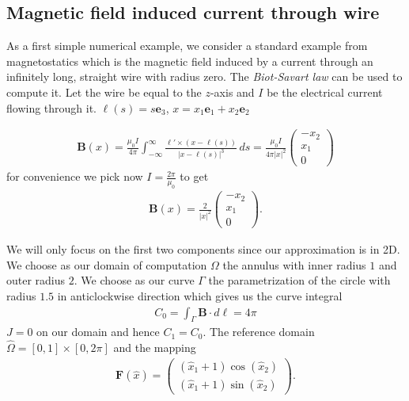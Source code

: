 \documentclass[../master_thesis.tex]{subfiles}
\begin{document}
\subsection{Magnetic field induced current through wire}
As a first simple numerical example, we consider a standard example from 
magnetostatics which is the magnetic field induced by a current through an infinitely long, 
straight wire with radius zero. The \textit{Biot-Savart law} can be used to compute it. 
Let the wire be equal to the $z$-axis and $I$ be the electrical current 
flowing through it. $\bm{\ell}(s) = s \mathbf{e}_3$, $x = x_1 \mathbf{e}_1 +  x_2 \mathbf{e}_2$

\begin{align*}
    \mathbf{B}(x) = \frac{\mu_0 I}{4\pi} \int_{-\infty}^\infty  
        \frac{\ell' \times (x - \ell(s))}{|x - \ell(s)|^3} \, ds
    = \frac{\mu_0 I}{4\pi |x|^2}  \begin{pmatrix}-x_2 \\ x_1 \\ 0 \end{pmatrix}
\end{align*}
for convenience we pick now $I = \frac{2 \pi}{\mu_0}$ to get 
\begin{align*}
    \mathbf{B}(x) = \frac{2}{|x|^2} \begin{pmatrix}-x_2 \\ x_1 \\ 0 \end{pmatrix}.
\end{align*}

We will only focus on the first two components since our approximation is in 2D.
We choose as our domain of computation $\Omega$ the annulus with 
inner radius $1$ and outer radius $2$. 
We choose as our curve $\Gamma$ the parametrization of the circle with radius 
$1.5$ in anticlockwise direction which gives us the curve integral 
\begin{align*}
    C_0 = \int_\Gamma \mathbf{B}\cdot d\ell = 4\pi
\end{align*}
$J= 0$ on our domain and hence $C_1 = C_0$. 
The reference domain $\hat{\Omega} = [0,1] \times [0, 2\pi]$ and the mapping 
\begin{align*}
    \mathbf{F}(\hat{x}) = \begin{pmatrix}
            (\hat{x}_1 + 1)\cos(\hat{x}_2 ) 
            \\ (\hat{x}_1 + 1)\sin(\hat{x}_2 ) 
    \end{pmatrix}.
\end{align*}
\end{document}
